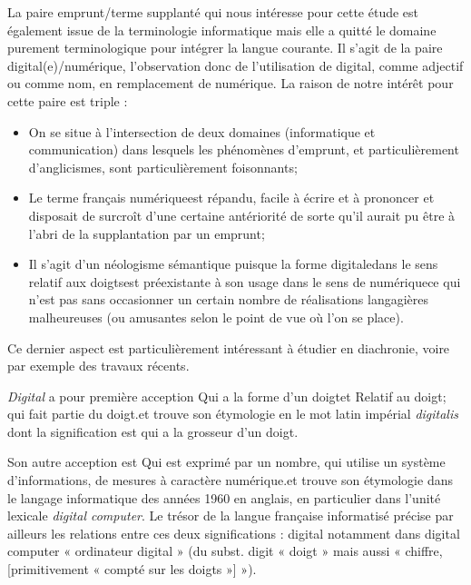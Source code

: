   La paire emprunt/terme supplanté qui nous intéresse pour cette étude est également issue de la terminologie informatique mais elle a quitté le domaine purement terminologique pour intégrer la langue courante.
Il s'agit de la paire digital(e)/numérique, l'observation donc de l'utilisation de \og digital\fg , comme adjectif ou comme nom, en remplacement de \og numérique\fg .
 La raison de notre intérêt pour cette paire est triple :
 \begin{itemize}
     \item On se situe à l'intersection de deux domaines (informatique et communication) dans lesquels les phénomènes d'emprunt, et particulièrement d'anglicismes, sont particulièrement foisonnants;
     \item Le terme français \og numérique\fg  est répandu, facile à écrire et à prononcer et disposait de surcroît d'une certaine antériorité de sorte qu'il aurait pu être à l'abri de la supplantation par un emprunt;
     \item Il s'agit d'un néologisme sémantique \cite{Moeschler-1974, Sablayrolles-2012} puisque la forme \og digitale\fg  dans le sens \og relatif aux doigts\fg  est préexistante à son usage dans le sens de \og numérique\fg  ce qui n'est pas sans occasionner un certain nombre de réalisations langagières malheureuses (ou amusantes selon le point de vue où l'on se place).
 \end{itemize}

Ce dernier aspect est particulièrement intéressant à étudier en diachronie, voire par exemple des travaux récents\cite{Jurafski-2016, Cartier-2016}.


 \textit{Digital} a pour première acception \og Qui a la forme d'un doigt\fg  et \og Relatif au doigt; qui fait partie du doigt.\fg  et trouve son étymologie en le mot latin impérial \textit{digitalis} dont la signification est \og qui a la grosseur d'un doigt\fg .

Son autre acception est \og Qui est exprimé par un nombre, qui utilise un système d'informations, de mesures à caractère numérique.\fg  et trouve son étymologie dans le langage informatique des années 1960 en anglais, en particulier dans l'unité lexicale \og \textit{digital computer}\fg .
 Le trésor de la langue française informatisé précise par ailleurs les relations entre ces deux significations : \og digital \fg notamment dans digital computer « ordinateur digital » (du subst. digit « doigt » mais aussi « chiffre, [primitivement « compté sur les doigts »] »). %

